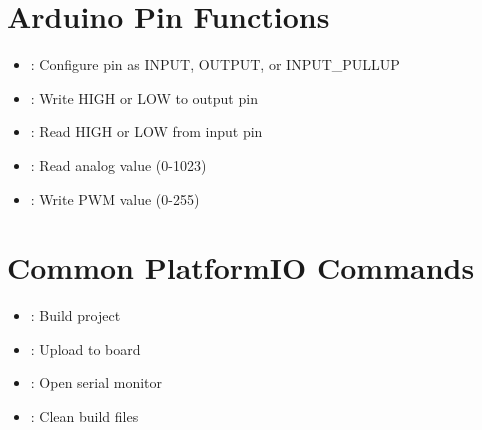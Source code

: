 \documentclass[12pt,a4paper]{book}
\begin{document}
\section{Arduino Pin Functions}
\begin{itemize}
    \item {}: Configure pin as INPUT, OUTPUT, or INPUT\_PULLUP
    \item {}: Write HIGH or LOW to output pin
    \item {}: Read HIGH or LOW from input pin
    \item {}: Read analog value (0-1023)
    \item {}: Write PWM value (0-255)
\end{itemize}

\section{Common PlatformIO Commands}
\begin{itemize}
    \item {}: Build project
    \item {}: Upload to board
    \item {}: Open serial monitor
    \item {}: Clean build files
\end{itemize}

\end{document}
